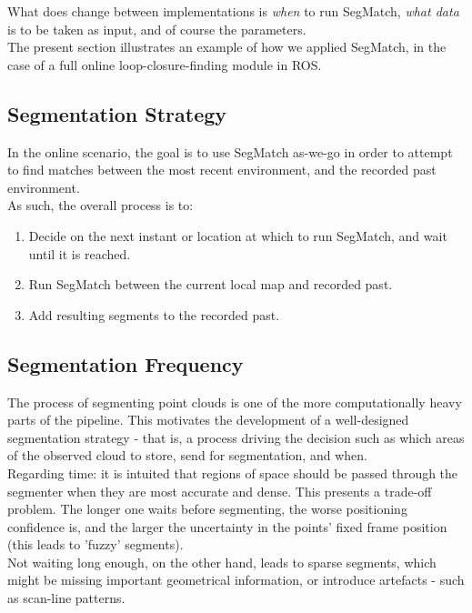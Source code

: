 What does change between implementations is \textit{when} to run SegMatch, \textit{what data} is to be taken as input, and of course the parameters.\\

The present section illustrates an example of how we applied SegMatch, in the case of a full online loop-closure-finding module in ROS.

\subsection{Segmentation Strategy}
\label{subsec:segmentation-strategy}

In the online scenario, the goal is to use SegMatch as-we-go in order to attempt to find matches between the most recent environment, and the recorded past environment.\\

As such, the overall process is to:   

\begin{enumerate}
\item Decide on the next instant or location at which to run SegMatch, and wait until it is reached.
\item Run SegMatch between the current local map and recorded past.
\item Add resulting segments to the recorded past.
\end{enumerate}

\subsection{Segmentation Frequency}
\label{subsec:segmentation-frequency}

The process of segmenting point clouds is one of the more computationally heavy parts of the pipeline. This motivates the development of a well-designed segmentation strategy - that is, a process driving the decision such as which areas of the observed cloud to store, send for segmentation, and when.\\

Regarding time: it is intuited that regions of space should be passed through the segmenter when they are most accurate and dense. This presents a trade-off problem. The longer one waits before segmenting, the worse positioning confidence is, and the larger the uncertainty in the points' fixed frame position (this leads to 'fuzzy' segments).\\

Not waiting long enough, on the other hand, leads to sparse segments, which might be missing important geometrical information, or introduce artefacts - such as scan-line patterns.


